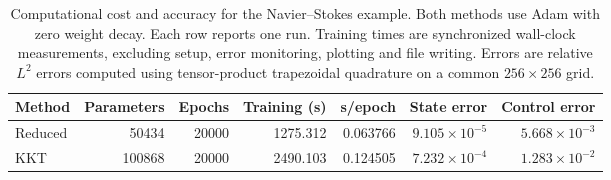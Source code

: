 \begin{table}[htbp]
\centering
{\color{blue}\small
\setlength{\tabcolsep}{4pt}
\begin{tabular}{lrrrrrr}
\hline
Method & Parameters & Epochs & Training (s) & s/epoch & State error & Control error \\
\hline
Reduced & 50434 & 20000 & 1275.312 & 0.063766 & $9.105\times10^{-5}$ & $5.668\times10^{-3}$ \\
KKT & 100868 & 20000 & 2490.103 & 0.124505 & $7.232\times10^{-4}$ & $1.283\times10^{-2}$ \\
\hline
\end{tabular}
\caption{Computational cost and accuracy for the Navier--Stokes example. Both methods use Adam with zero weight decay. Each row reports one run. Training times are synchronized wall-clock measurements, excluding setup, error monitoring, plotting and file writing. Errors are relative $L^2$ errors computed using tensor-product trapezoidal quadrature on a common $256\times256$ grid.}
\label{tab:navier_stokes_cost}
}
\end{table}
